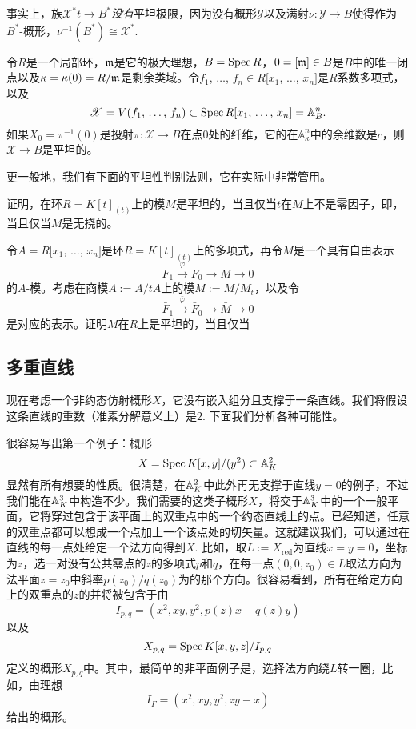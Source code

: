 事实上，族$\mathscr{X}^*t\to B^*$\textit{没有}平坦极限，因为\nottran 没有概形$\mathscr{Y}$以及满射$\nu:\mathscr{Y}\to B$使得作为$B^*$\hyp 概形，$\nu^{-1}(B^*)\cong \mathscr{X}^*$. 

\begin{pro}
	令$R$是一个局部环，$\mathfrak{m}$是它的极大理想，$B=\operatorname{Spec} R$，$0=[\mathfrak{m}]\in B$是$B$中的唯一闭点以及$\kappa=\kappa(0)=R/\mathfrak{m}$是剩余类域。令$f_1$, $\dots$, $f_n\in R[x_1$, $\dots$, $x_n]$是$R$系数多项式，以及
	\[
	\mathscr{X}=V(\text{$f_1$, $\dots$, $f_n$})\subset \operatorname{Spec} R[\text{$x_1$, $\dots$, $x_n$}]=\mathbb{A}_{B}^n.
	\]
	如果$X_0=\pi^{-1}(0)$是投射$\pi:\mathscr{X}\to B$在点$0$处的纤维，它的在$\mathbb{A}_{\kappa}^n$中的余维数是$c$，则$\mathscr{X}\to B$是平坦的。
\end{pro}

更一般地，我们有下面的平坦性判别法则，它在实际中非常管用。

\begin{exe}
\begin{compactenum}[(a)]
\item 证明，在环$R=K[t]_{(t)}$上的模$M$是平坦的，当且仅当$t$在$M$上不是零因子，即，当且仅当$M$是无挠的。

\item 令$A=R[x_1$, $\dots$, $x_n]$是环$R=K[t]_{(t)}$上的多项式，再令$M$是一个具有自由表示
\[
	F_1\xrightarrow{\varphi}F_0\to M\to 0
\]
的$A$\hyp 模。考虑在商模$\bar{A}:=A/tA$上的模$\bar{M}:= M/M_t$，以及令
\[
	\bar{F}_1\xrightarrow{\bar{\varphi}}\bar{F}_0\to \bar{M}\to 0
\]
是对应的表示。证明$M$在$R$上是平坦的，当且仅当
\end{compactenum}
\end{exe}

\subsection{多重直线}

现在考虑一个非约态仿射概形$X$，它没有嵌入组分且支撑于一条直线。我们将假设这条直线的重数（准素分解意义上）是$2$. 下面我们分析各种可能性。

很容易写出第一个例子：概形
\[
	X=\operatorname{Spec} K[x,y]/(y^2)\subset \mathbb{A}_K^2
\]
显然有所有想要的性质。很清楚，在$\mathbb{A}_K^2$中此外再无支撑于直线$y=0$的例子，不过我们能在$\mathbb{A}_K^3$中构造不少。我们需要的这类子概形$X$，将交于$\mathbb{A}_{K}^3$中的一个一般平面，它将穿过包含于该平面上的双重点中的一个约态直线上的点。\nottran 已经知道，任意的双重点都可以想成一个点加上一个该点处的切矢量。这就建议我们，可以通过在直线的每一点处给定一个法方向得到$X$. 比如，取$L:=X_{\text{red}}$为直线$x=y=0$，坐标为$z$，选一对没有公共零点的$z$的多项式$p$和$q$，在每一点$(0,0,z_0)\in L$取法方向为法平面$z=z_0$中斜率$p(z_0)/q(z_0)$为的那个方向。很容易看到，所有在给定方向上的双重点的$z$的并将被包含于由
\[
	I_{p,q}=(x^2,xy,y^2,p(z)x-q(z)y)
\]
以及
\[
	X_{p,q}=\operatorname{Spec} K[x,y,z]/I_{p,q}
\]
定义的概形$X_{p,q}$中。其中，最简单的非平面例子是，选择法方向绕$L$转一圈，比如，由理想
\[
	I_\Gamma=(x^2,xy,y^2,zy-x)
\]
给出的概形。

